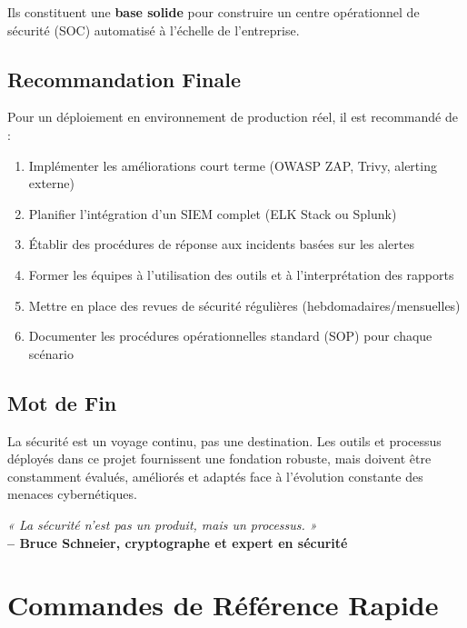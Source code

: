 \documentclass[11pt,a4paper]{report}
\begin{document}
Ils constituent une \textbf{base solide} pour construire un centre opérationnel de sécurité (SOC) automatisé à l'échelle de l'entreprise.

\section{Recommandation Finale}

Pour un déploiement en environnement de production réel, il est recommandé de :
\begin{enumerate}
    \item Implémenter les améliorations court terme (OWASP ZAP, Trivy, alerting externe)
    \item Planifier l'intégration d'un SIEM complet (ELK Stack ou Splunk)
    \item Établir des procédures de réponse aux incidents basées sur les alertes
    \item Former les équipes à l'utilisation des outils et à l'interprétation des rapports
    \item Mettre en place des revues de sécurité régulières (hebdomadaires/mensuelles)
    \item Documenter les procédures opérationnelles standard (SOP) pour chaque scénario
\end{enumerate}

\section{Mot de Fin}

La sécurité est un voyage continu, pas une destination. Les outils et processus déployés dans ce projet fournissent une fondation robuste, mais doivent être constamment évalués, améliorés et adaptés face à l'évolution constante des menaces cybernétiques.

\vspace{1cm}

\begin{center}
\textit{« La sécurité n'est pas un produit, mais un processus. »} \\
\textbf{-- Bruce Schneier, cryptographe et expert en sécurité}
\end{center}


\appendix

\chapter{Commandes de Référence Rapide}
\end{document}
